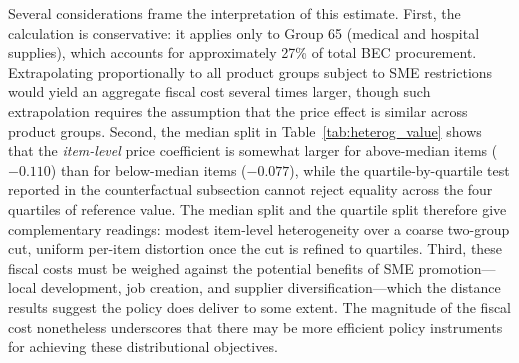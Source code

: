 Several considerations frame the interpretation of this estimate. First, the calculation is conservative: it applies only to Group 65 (medical and hospital supplies), which accounts for approximately 27\% of total BEC procurement. Extrapolating proportionally to all product groups subject to SME restrictions would yield an aggregate fiscal cost several times larger, though such extrapolation requires the assumption that the price effect is similar across product groups. Second, the median split in Table~\ref{tab:heterog_value} shows that the \emph{item-level} price coefficient is somewhat larger for above-median items ($-0.110$) than for below-median items ($-0.077$), while the quartile-by-quartile test reported in the counterfactual subsection cannot reject equality across the four quartiles of reference value. The median split and the quartile split therefore give complementary readings: modest item-level heterogeneity over a coarse two-group cut, uniform per-item distortion once the cut is refined to quartiles. Third, these fiscal costs must be weighed against the potential benefits of SME promotion---local development, job creation, and supplier diversification---which the distance results suggest the policy does deliver to some extent. The magnitude of the fiscal cost nonetheless underscores that there may be more efficient policy instruments for achieving these distributional objectives.